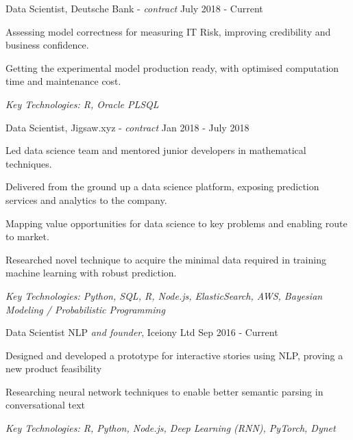 \documentclass[11pt,article,oneside]{memoir}
\newenvironment{itemize*}{%
  \renewcommand\labelitemi{\textbullet}
  \footnotesize
  \begin{itemize}%
    \setlength{\itemsep}{0pt}}%
  {\end{itemize}
}
\begin{document}
\newpage 


\normalsize
\medskip
\ind Data Scientist, Deutsche Bank - \emph{contract} \hfill July 2018 - Current
\begin{itemize*}
    \item Assessing model correctness for measuring IT Risk, improving credibility and business confidence. 
    \item Getting the experimental model production ready, with optimised computation time and maintenance cost. 
\end{itemize*}
\ind \hspace{0.35in} \footnotesize \emph{Key Technologies: R, Oracle PLSQL}

\normalsize
\medskip
\ind Data Scientist, Jigsaw.xyz - \emph{contract} \hfill Jan 2018 - July 2018
\begin{itemize*}
  \item Led data science team and mentored junior developers in mathematical techniques.
  \item Delivered from the ground up a data science platform, exposing prediction services and analytics to the company.
  \item Mapping value opportunities for data science to key problems and enabling route to market.
  \item Researched novel technique to acquire the minimal data required in training machine learning with robust prediction.  
\end{itemize*}
\ind \hspace{0.35in} \footnotesize \emph{Key Technologies: Python, SQL, R, Node.js, ElasticSearch, AWS, Bayesian Modeling / Probabilistic Programming}

\normalsize
\medskip
\ind Data Scientist NLP \emph{and founder}, Iceiony Ltd \hfill Sep 2016 - Current
\begin{itemize*}
  \item Designed and developed a prototype for interactive stories using NLP, proving a new product feasibility 
  \item Researching neural network techniques to enable better semantic parsing in conversational text 
\end{itemize*}
\ind \hspace{0.35in} \footnotesize \emph{Key Technologies: R, Python, Node.js, Deep Learning (RNN), PyTorch, Dynet}
\end{document}
